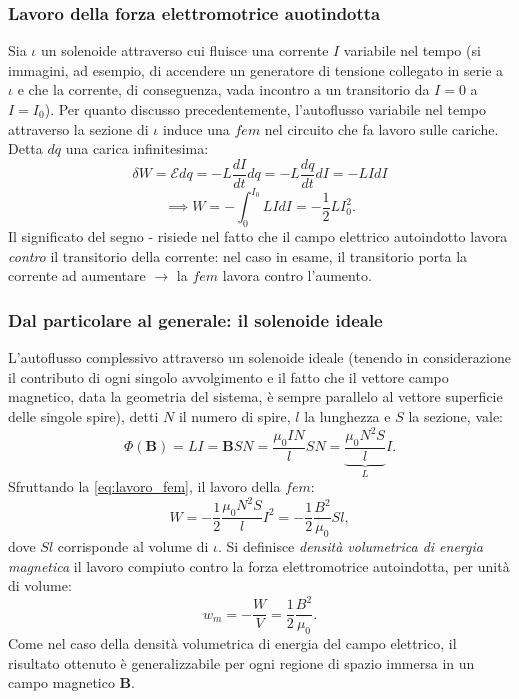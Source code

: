 \documentclass[a4paper,11pt]{report}
\begin{document}
\subsubsection{Lavoro della forza elettromotrice auotindotta}
Sia $\iota$ un solenoide attraverso cui fluisce una corrente $I$ variabile nel tempo (si immagini, ad esempio, di accendere un generatore di tensione collegato in serie a $\iota$ e che la corrente, di conseguenza, vada incontro a un transitorio da $I = 0$ a $I = I_0$). Per quanto discusso precedentemente, l'autoflusso variabile nel tempo attraverso la sezione di $\iota$ induce una $fem$ nel circuito che fa lavoro sulle cariche. Detta $dq$ una carica infinitesima:
\begin{equation}
\delta W = \mathcal{E}dq = -L\frac{dI}{dt}dq = -L\frac{dq}{dt}dI = -LIdI
\end{equation}
\begin{equation}
\implies W = -\int_0^{I_0} LIdI = -\frac{1}{2}LI_0^2.
\label{eq:lavoro_fem}
\end{equation}
Il significato del segno - risiede nel fatto che il campo elettrico autoindotto lavora \textit{contro} il transitorio della corrente: nel caso in esame, il transitorio porta la corrente ad aumentare $\rightarrow$ la $fem$ lavora contro l'aumento. 

\subsubsection{Dal particolare al generale: il solenoide ideale}
L'autoflusso complessivo attraverso un solenoide ideale (tenendo in considerazione il contributo di ogni singolo avvolgimento e il fatto che il vettore campo magnetico, data la geometria del sistema, è sempre parallelo al vettore superficie delle singole spire), detti $N$ il numero di spire, $l$ la lunghezza e $S$ la sezione, vale:
\begin{equation}
\Phi(\bm{B}) = LI = \bm{B} S N= \frac{\mu_0 I N}{l} SN = \underbrace{\frac{\mu_0 N^2 S}{l}}_{L} I.
\end{equation}
Sfruttando la \eqref{eq:lavoro_fem}, il lavoro della $fem$:
\begin{equation}
W = -\frac{1}{2} \frac{\mu_0 N^2 S}{l} I^2 = -\frac{1}{2} \frac{B^2}{\mu_0} Sl,
\end{equation}
dove $Sl$ corrisponde al volume di $\iota$. Si definisce \textit{densità volumetrica di energia magnetica} il lavoro compiuto contro la forza elettromotrice autoindotta, per unità di volume:
\begin{equation}
w_m = -\frac{W}{V} =\frac{1}{2} \frac{B^2}{\mu_0}.
\end{equation}
Come nel caso della densità volumetrica di energia del campo elettrico, il risultato ottenuto è generalizzabile per ogni regione di spazio immersa in un campo magnetico $\bm{B}$.
\end{document}
